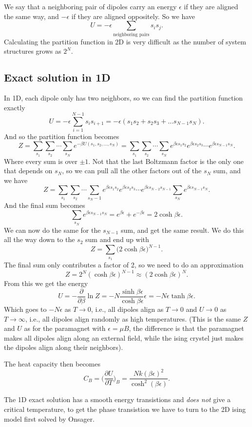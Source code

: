 \documentclass[a4paper, 11pt, notitlepage, english]{article}
\newcommand{\eps}{\epsilon}
\newcommand{\p}{\partial}
\begin{document}
We say that a neighboring pair of dipoles carry an energy $\eps$ if they are aligned the same way, and $-\eps$ if they are aligned oppositely. So we have
$$U = - \eps \sum_{\mbox{neighboring pairs}} s_is_j.$$
Calculating the partition function in 2D is very difficult as the number of system structures grows as $2^N$. 

\subsection*{Exact solution in 1D}
In 1D, each dipole only has two neighbors, so we can find the partition function exactly
$$U = -\eps \sum_{i=1}^{N-1} s_i s_{i+1} = -\eps(s_1s_2 + s_2s_3 + \ldots s_{N-1}s_N).$$
And so the partition function becomes
$$Z = \sum_{s_1}\sum_{s_2}\cdots\sum_{s_N}e^{-\beta U(s_1,s_2,\ldots,s_N)} =  \sum_{s_1}\sum_{s_2}\cdots\sum_{s_N} e^{\beta \eps s_1s_2}e^{\beta \eps s_2s_3}\cdots e^{\beta \eps s_{N-1}s_{N}}.$$
Where every sum is over $\pm 1$. Not that the last Boltzmann factor is the only one that depends on $s_N$, so we can pull all the other factors out of the $s_N$ sum, and we have
$$Z = \sum_{s_1}\sum_{s_2}\cdots\sum_{s_N-1} e^{\beta \eps s_1s_2}e^{\beta \eps s_2s_3}\cdots e^{\beta \eps s_{N-2}s_{N-1}} \sum_{s_N} e^{\beta \eps s_{N-1}s_{N}}.$$
And the final sum becomes
$$\sum_{s_N} e^{\beta \eps s_{N-1}s_{N}} = e^{\beta \eps} + e^{-\beta \eps} = 2\cosh\beta \eps.$$
We can now do the same for the $s_{N-1}$ sum, and get the same result. We do this all the way down to the $s_2$ sum and end up with
$$Z = \sum_{s_1} \big(2\cosh \beta \eps \big)^{N-1}.$$
The final sum only contributes a factor of 2, so we need to do an approximation
$$Z = 2^N (\cosh \beta \eps)^{N-1} \approx (2 \cosh \beta \eps)^N.$$
From this we get the energy
$$U = -\frac{\p}{\p \beta} \ln Z = -N \frac{\sinh \beta \eps}{\cosh \beta \eps} \eps = - N\eps \tanh \beta \eps.$$
Which goes to $-N\eps$ as $T\to 0$, i.e., all dipoles align as $T\to 0$ and $U \to 0$ as $T \to \infty$, i.e., all dipoles align randomly as high temperatures. (This is the same $Z$ and $U$ as for the paramagnet with $\eps = \mu B$, the difference is that the paramagnet makes all dipoles align along an external field, while the ising crystel just makes the dipoles align along their neighbors).

The heat capacity then becomes
$$C_B = \bigg(\frac{\p U}{\p T}\bigg)_B = \frac{Nk (\beta \eps)^2}{\cosh^2(\beta \eps)}.$$

The 1D exact solution has a smooth energy transistions and \emph{does not} give a critical temperature, to get the phase transistion we have to turn to the 2D ising model first solved by Onsager.
\end{document}
